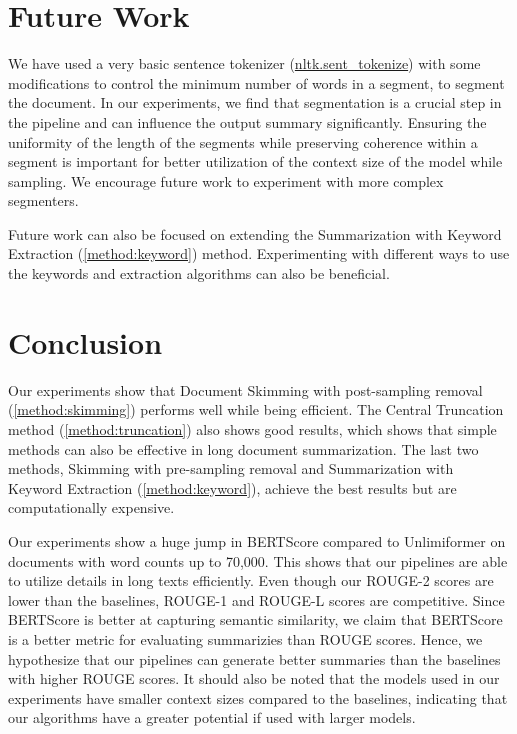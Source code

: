 \section{Future Work}
	\label{sec:future-work}

	We have used a very basic sentence tokenizer
	(\href{https://www.nltk.org/api/nltk.tokenize.sent_tokenize.html}{nltk.sent\_tokenize})
	with some modifications to control the minimum number of words in a segment, to segment
	the document.
	In our experiments, we find that segmentation is a crucial step in the pipeline and can
	influence the output summary significantly.
	Ensuring the uniformity of the length of the segments while preserving coherence within a
	segment is important for better utilization of the context size of the model while sampling.
	We encourage future work to experiment with more complex segmenters.

	Future work can also be focused on extending the Summarization with Keyword Extraction
	(\ref{method:keyword}) method.
	Experimenting with different ways to use the keywords and extraction algorithms can also be
	beneficial.


\section{Conclusion}
\label{sec:conclusion}

	Our experiments show that Document Skimming with post-sampling removal (\ref{method:skimming})
	performs well while being efficient.
	The Central Truncation method (\ref{method:truncation}) also shows good results, which
	shows that simple methods can also be effective in long document summarization.
	The last two methods, Skimming with pre-sampling removal and Summarization with Keyword
	Extraction (\ref{method:keyword}), achieve the best results but are computationally expensive.

	Our experiments show a huge jump in BERTScore compared to Unlimiformer on documents with
	word counts up to 70,000.
	This shows that our pipelines are able to utilize details in long texts efficiently.
	Even though our ROUGE-2 scores are lower than the baselines, ROUGE-1 and ROUGE-L scores are
	competitive.
	Since BERTScore is better at capturing semantic similarity, we claim that BERTScore is a
	better metric for evaluating summarizies than ROUGE scores.
	Hence, we hypothesize that our pipelines can generate better summaries than the baselines
	with higher ROUGE scores.
	It should also be noted that the models used in our experiments have smaller context sizes
	compared to the baselines, indicating that our algorithms have a greater potential if
	used with larger models.


